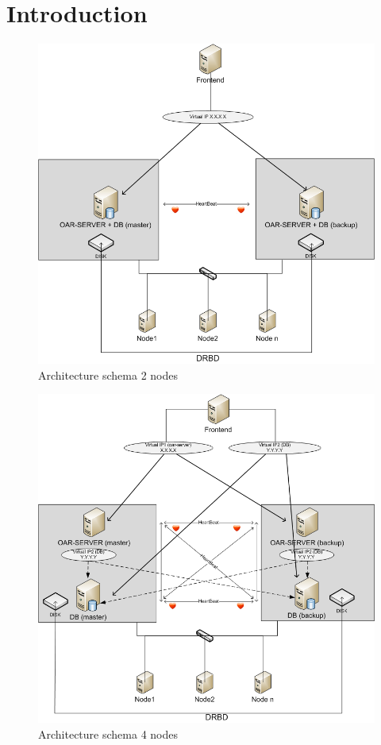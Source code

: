 \documentclass[a4paper,10pt]{report}
\begin{document}
\chapter{Introduction}
\begin{figure}
\begin{center}
\includegraphics[scale=0.5]{schema/architecture-schema-2-node.png}
\end{center}
\caption{Architecture schema 2 nodes} 
\label{2nodesschema} 
\end{figure} 
\begin{figure}
\begin{center}
\includegraphics[scale=0.5]{schema/architecture-schema-4-node.png}
\end{center}
\caption{Architecture schema 4 nodes} 
\label{4nodesschema} 
\end{figure} 
\end{document}
